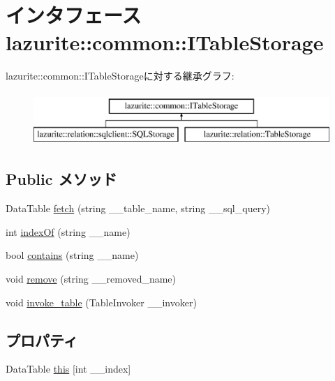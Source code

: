 \hypertarget{interfacelazurite_1_1common_1_1_i_table_storage}{
\section{インタフェース lazurite::common::ITableStorage}
\label{interfacelazurite_1_1common_1_1_i_table_storage}
}
lazurite::common::ITableStorageに対する継承グラフ:\begin{figure}[H]
\begin{center}
\leavevmode
\includegraphics[height=2cm]{interfacelazurite_1_1common_1_1_i_table_storage}
\end{center}
\end{figure}
\subsection*{Public メソッド}
\begin{DoxyCompactItemize}
\item 
DataTable \hyperlink{interfacelazurite_1_1common_1_1_i_table_storage_a2607a18e5f7931dfc5ecacbc21f077e3}{fetch} (string \_\-\_\-table\_\-name, string \_\-\_\-sql\_\-query)
\item 
int \hyperlink{interfacelazurite_1_1common_1_1_i_table_storage_af50cc04c6deb3b470182f1f076355526}{indexOf} (string \_\-\_\-name)
\item 
bool \hyperlink{interfacelazurite_1_1common_1_1_i_table_storage_a2645db3c1b04ecd4e76f00edaf65ba03}{contains} (string \_\-\_\-name)
\item 
void \hyperlink{interfacelazurite_1_1common_1_1_i_table_storage_abb90f2c62e425951cebd5cd5067a005a}{remove} (string \_\-\_\-removed\_\-name)
\item 
void \hyperlink{interfacelazurite_1_1common_1_1_i_table_storage_a7ae87b836b9490c25ebd6c20ea8429b7}{invoke\_\-table} (TableInvoker \_\-\_\-invoker)
\end{DoxyCompactItemize}
\subsection*{プロパティ}
\begin{DoxyCompactItemize}
\item 
DataTable \hyperlink{interfacelazurite_1_1common_1_1_i_table_storage_adba59c2b0bb2d632fbc2ae087b6b63f3}{this} \mbox{[}int \_\-\_\-index\mbox{]}
\end{DoxyCompactItemize}


